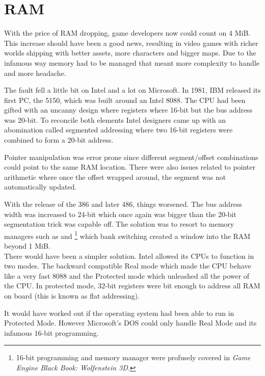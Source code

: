 \section{RAM}
With the price of RAM dropping, game developers now could count on 4 MiB. This increase should have been a good news, resulting in video games with richer worlds shipping with better assets, more characters and bigger maps. Due to the infamous way memory had to be managed that meant more complexity to handle and more headache.\\
\par
The fault fell a little bit on Intel and a lot on Microsoft. In 1981, IBM released its first PC, the 5150,  which was built around an Intel 8088. The CPU had been gifted with an uncanny design where registers where 16-bit but the bus address was 20-bit. To reconcile both elements Intel designers came up with an abomination called segmented addressing where two 16-bit registers were combined to form a 20-bit address.\\
\par


\par
Pointer manipulation was error prone since different segment/offset combinations could point to the same RAM location. There were also issues related to pointer arithmetic where once the offset wrapped around, the segment was not automatically updated.\\
\par
With the release of the 386 and later 486, things worsened. The bus address width was increased to 24-bit which once again was bigger than the 20-bit segmentation trick was capable off. The solution was to resort to memory managers such as  and \footnote{16-bit programming and memory manager were profusely covered in \textit{Game Engine Black Book: Wolfenstein 3D}.} which  bank switching created a window into the RAM beyond 1 MiB.\\

There would have been a simpler solution. Intel allowed its CPUs to function in two modes. The backward compatible Real mode which made the CPU behave like a very fast 8088 and the Protected mode which unleashed all the power of the CPU. In protected mode, 32-bit registers were bit enough to address all RAM on board (this is known as flat addressing).\\
\par
It would have worked out if the operating system had been able to run in Protected Mode. However Microsoft's DOS could only handle Real Mode and its infamous 16-bit programming.\\ 
\par





